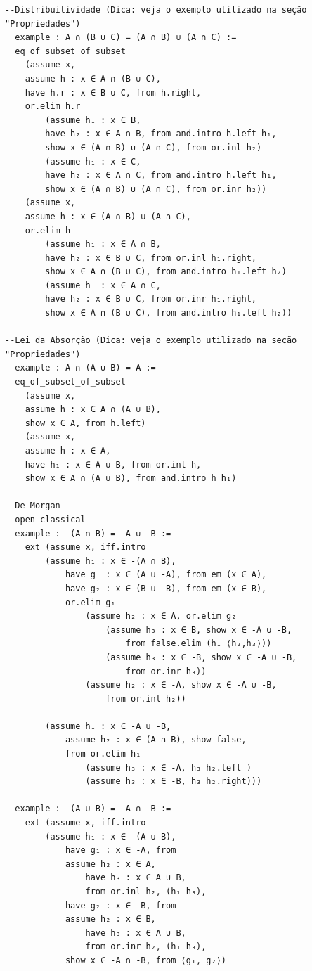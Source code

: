 \begin{enumerate}
\begin{lstlisting}
--Distribuitividade (Dica: veja o exemplo utilizado na seção "Propriedades")
  example : A ∩ (B ∪ C) = (A ∩ B) ∪ (A ∩ C) :=
  eq_of_subset_of_subset
    (assume x,
    assume h : x ∈ A ∩ (B ∪ C),
    have h.r : x ∈ B ∪ C, from h.right,
    or.elim h.r
        (assume h₁ : x ∈ B,
        have h₂ : x ∈ A ∩ B, from and.intro h.left h₁,
        show x ∈ (A ∩ B) ∪ (A ∩ C), from or.inl h₂)
        (assume h₁ : x ∈ C,
        have h₂ : x ∈ A ∩ C, from and.intro h.left h₁,
        show x ∈ (A ∩ B) ∪ (A ∩ C), from or.inr h₂))
    (assume x,
    assume h : x ∈ (A ∩ B) ∪ (A ∩ C),
    or.elim h
        (assume h₁ : x ∈ A ∩ B,
        have h₂ : x ∈ B ∪ C, from or.inl h₁.right,
        show x ∈ A ∩ (B ∪ C), from and.intro h₁.left h₂)
        (assume h₁ : x ∈ A ∩ C,
        have h₂ : x ∈ B ∪ C, from or.inr h₁.right,
        show x ∈ A ∩ (B ∪ C), from and.intro h₁.left h₂))

--Lei da Absorção (Dica: veja o exemplo utilizado na seção "Propriedades")
  example : A ∩ (A ∪ B) = A :=
  eq_of_subset_of_subset
    (assume x,
    assume h : x ∈ A ∩ (A ∪ B),
    show x ∈ A, from h.left)
    (assume x,
    assume h : x ∈ A,
    have h₁ : x ∈ A ∪ B, from or.inl h,
    show x ∈ A ∩ (A ∪ B), from and.intro h h₁)
    
--De Morgan
  open classical 
  example : -(A ∩ B) = -A ∪ -B :=
    ext (assume x, iff.intro
        (assume h₁ : x ∈ -(A ∩ B),
            have g₁ : x ∈ (A ∪ -A), from em (x ∈ A),
            have g₂ : x ∈ (B ∪ -B), from em (x ∈ B),
            or.elim g₁
                (assume h₂ : x ∈ A, or.elim g₂
                    (assume h₃ : x ∈ B, show x ∈ -A ∪ -B,
                        from false.elim (h₁ ⟨h₂,h₃⟩))
                    (assume h₃ : x ∈ -B, show x ∈ -A ∪ -B,
                        from or.inr h₃))
                (assume h₂ : x ∈ -A, show x ∈ -A ∪ -B,
                    from or.inl h₂))

        (assume h₁ : x ∈ -A ∪ -B,
            assume h₂ : x ∈ (A ∩ B), show false,
            from or.elim h₁
                (assume h₃ : x ∈ -A, h₃ h₂.left )
                (assume h₃ : x ∈ -B, h₃ h₂.right)))

  example : -(A ∪ B) = -A ∩ -B :=
    ext (assume x, iff.intro
        (assume h₁ : x ∈ -(A ∪ B),
            have g₁ : x ∈ -A, from
            assume h₂ : x ∈ A,
                have h₃ : x ∈ A ∪ B,
                from or.inl h₂, (h₁ h₃),
            have g₂ : x ∈ -B, from
            assume h₂ : x ∈ B,
                have h₃ : x ∈ A ∪ B,
                from or.inr h₂, (h₁ h₃),
            show x ∈ -A ∩ -B, from ⟨g₁, g₂⟩)


\end{lstlisting}
\end{enumerate}
